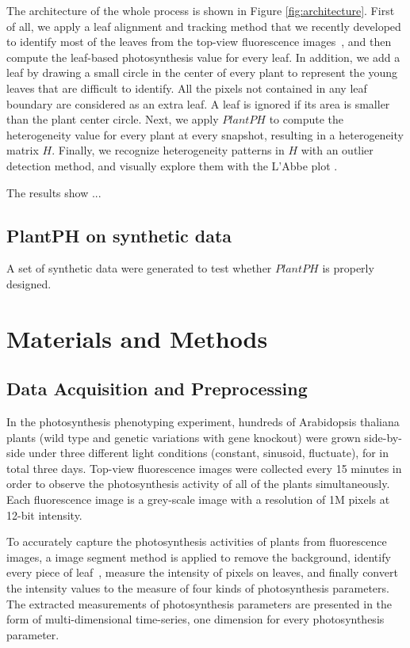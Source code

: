 {The architecture of the whole process is shown in Figure \ref{fig:architecture}. First of all, we apply a leaf alignment and tracking method that we recently developed to identify most of the leaves from the top-view fluorescence images~\cite{xi2014tracking,yin2014}, and then compute the leaf-based photosynthesis value for every leaf. In addition, we add a leaf by drawing a small circle in the center of every plant to represent the young leaves that are difficult to identify.
%
All the pixels not contained in any leaf boundary are considered as an extra leaf. A leaf is ignored if its area is smaller than the plant center circle. 
%
Next, we apply $PlantPH$ to compute the heterogeneity value for every plant at every snapshot, resulting in a heterogeneity matrix $H$. Finally, we recognize heterogeneity patterns in $H$ with an outlier detection method, and visually explore them with the L'Abbe plot \cite{song1999exploring}.

The results show ...



\subsection*{PlantPH on synthetic data}

A set of synthetic data were generated to test whether $PlantPH$ is properly designed. 

\section*{Materials and Methods}

\subsection*{Data Acquisition and Preprocessing}

In the photosynthesis phenotyping experiment, hundreds of Arabidopsis thaliana plants (wild type and genetic variations with gene knockout) were grown side-by-side under three different light conditions (constant, sinusoid, fluctuate), for in total three days.
%
Top-view fluorescence images were collected every 15 minutes in order to observe the photosynthesis activity of all of the plants simultaneously. Each fluorescence image is a grey-scale image with a resolution of 1M pixels at 12-bit intensity.

To accurately capture the photosynthesis activities of plants from fluorescence images, a image segment method is applied to remove the background, identify every piece of leaf~\cite{yin2014}, measure the intensity of pixels on leaves, and finally convert the intensity values to the measure of four kinds of photosynthesis parameters.
%
The extracted measurements of photosynthesis parameters are presented in the form of multi-dimensional time-series, one dimension for every photosynthesis parameter.
%

}

